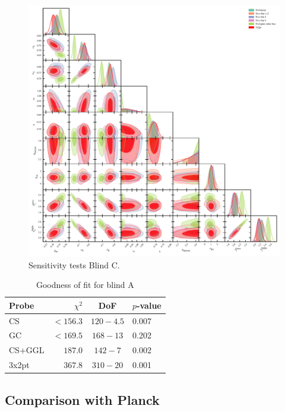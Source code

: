 \begin{figure}
	\begin{center}
		\includegraphics[width=\textwidth]{Parameter_Plots/systematics/blind_C_EE_nE_w_systematics_chains}
		\caption{Sensitivity tests Blind C. }
		\label{fig:sensitivity_tests}
	\end{center}
\end{figure}

\begin{table}
	\begin{center}
		\caption{Goodness of fit for blind A}
		\label{tab:goodness-of-fit}
\begin{tabular}{lrcl}
    \toprule
    Probe             & $\chi^2$       & DoF       & $p$-value   \\
    \midrule
	CS               & $< 156.3$ & $120-4.5$ & 0.007 \\
	GC               & $< 169.5$ & $168-13$ & 0.202 \\
	CS+GGL           & $187.0$ & $142-7$ & 0.002 \\
	3x2pt            & $367.8$ & $310-20$ & 0.001 \\

    \bottomrule
\end{tabular}
	\end{center}
\end{table}


\subsection{Comparison with Planck}
\label{sec:planck_comp}
